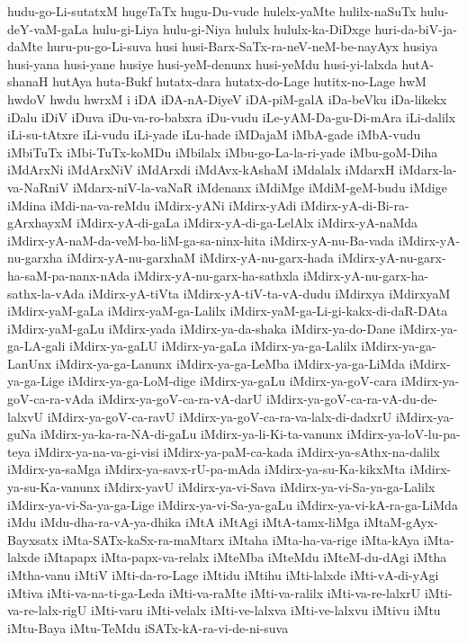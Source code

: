 {hudu-go-Li-sutatxM
hugeTaTx
hugu-Du-vude
hulelx-yaMte
hulilx-naSuTx
hulu-deY-vaM-gaLa
hulu-gi-Liya
hulu-gi-Niya
hululx
hululx-ka-DiDxge
huri-da-biV-ja-daMte
huru-pu-go-Li-suva
husi
husi-Barx-SaTx-ra-neV-neM-be-nayAyx
husiya
husi-yana
husi-yane
husiye
husi-yeM-denunx
husi-yeMdu
husi-yi-lalxda
hutA-shanaH
hutAya
huta-Bukf
hutatx-dara
hutatx-do-Lage
hutitx-no-Lage
hwM
hwdoV
hwdu
hwrxM
i
iDA
iDA-nA-DiyeV
iDA-piM-galA
iDa-beVku
iDa-likekx
iDalu
iDiV
iDuva
iDu-va-ro-babxra
iDu-vudu
iLe-yAM-Da-gu-Di-mAra
iLi-dalilx
iLi-su-tAtxre
iLi-vudu
iLi-yade
iLu-hade
iMDajaM
iMbA-gade
iMbA-vudu
iMbiTuTx
iMbi-TuTx-koMDu
iMbilalx
iMbu-go-La-la-ri-yade
iMbu-goM-Diha
iMdArxNi
iMdArxNiV
iMdArxdi
iMdAvx-kAshaM
iMdalalx
iMdarxH
iMdarx-la-va-NaRniV
iMdarx-niV-la-vaNaR
iMdenanx
iMdiMge
iMdiM-geM-budu
iMdige
iMdina
iMdi-na-va-reMdu
iMdirx-yANi
iMdirx-yAdi
iMdirx-yA-di-Bi-ra-gArxhayxM
iMdirx-yA-di-gaLa
iMdirx-yA-di-ga-LelAlx
iMdirx-yA-naMda
iMdirx-yA-naM-da-veM-ba-liM-ga-sa-ninx-hita
iMdirx-yA-nu-Ba-vada
iMdirx-yA-nu-garxha
iMdirx-yA-nu-garxhaM
iMdirx-yA-nu-garx-hada
iMdirx-yA-nu-garx-ha-saM-pa-nanx-nAda
iMdirx-yA-nu-garx-ha-sathxla
iMdirx-yA-nu-garx-ha-sathx-la-vAda
iMdirx-yA-tiVta
iMdirx-yA-tiV-ta-vA-dudu
iMdirxya
iMdirxyaM
iMdirx-yaM-gaLa
iMdirx-yaM-ga-Lalilx
iMdirx-yaM-ga-Li-gi-kakx-di-daR-DAta
iMdirx-yaM-gaLu
iMdirx-yada
iMdirx-ya-da-shaka
iMdirx-ya-do-Dane
iMdirx-ya-ga-LA-gali
iMdirx-ya-gaLU
iMdirx-ya-gaLa
iMdirx-ya-ga-Lalilx
iMdirx-ya-ga-LanUnx
iMdirx-ya-ga-Lanunx
iMdirx-ya-ga-LeMba
iMdirx-ya-ga-LiMda
iMdirx-ya-ga-Lige
iMdirx-ya-ga-LoM-dige
iMdirx-ya-gaLu
iMdirx-ya-goV-cara
iMdirx-ya-goV-ca-ra-vAda
iMdirx-ya-goV-ca-ra-vA-darU
iMdirx-ya-goV-ca-ra-vA-du-de-lalxvU
iMdirx-ya-goV-ca-ravU
iMdirx-ya-goV-ca-ra-va-lalx-di-dadxrU
iMdirx-ya-guNa
iMdirx-ya-ka-ra-NA-di-gaLu
iMdirx-ya-li-Ki-ta-vanunx
iMdirx-ya-loV-lu-pa-teya
iMdirx-ya-na-va-gi-visi
iMdirx-ya-paM-ca-kada
iMdirx-ya-sAthx-na-dalilx
iMdirx-ya-saMga
iMdirx-ya-savx-rU-pa-mAda
iMdirx-ya-su-Ka-kikxMta
iMdirx-ya-su-Ka-vanunx
iMdirx-yavU
iMdirx-ya-vi-Sava
iMdirx-ya-vi-Sa-ya-ga-Lalilx
iMdirx-ya-vi-Sa-ya-ga-Lige
iMdirx-ya-vi-Sa-ya-gaLu
iMdirx-ya-vi-kA-ra-ga-LiMda
iMdu
iMdu-dha-ra-vA-ya-dhika
iMtA
iMtAgi
iMtA-tamx-liMga
iMtaM-gAyx-Bayxsatx
iMta-SATx-kaSx-ra-maMtarx
iMtaha
iMta-ha-va-rige
iMta-kAya
iMta-lalxde
iMtapapx
iMta-papx-va-relalx
iMteMba
iMteMdu
iMteM-du-dAgi
iMtha
iMtha-vanu
iMtiV
iMti-da-ro-Lage
iMtidu
iMtihu
iMti-lalxde
iMti-vA-di-yAgi
iMtiva
iMti-va-na-ti-ga-Leda
iMti-va-raMte
iMti-va-ralilx
iMti-va-re-lalxrU
iMti-va-re-lalx-rigU
iMti-varu
iMti-velalx
iMti-ve-lalxva
iMti-ve-lalxvu
iMtivu
iMtu
iMtu-Baya
iMtu-TeMdu
iSATx-kA-ra-vi-de-ni-suva
}
